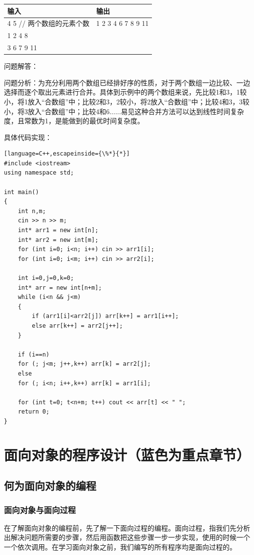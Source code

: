 \documentclass[UTF8]{ctexart}
\begin{document}
\begin{itemize}
\begin{tabular}{|l|l|}
	\hline
	输入 & 输出 \\
	\hline
	4 5 // 两个数组的元素个数 & 1 2 3 4 6 7 8 9 11 \\
	1 2 4 8 & \\
	3 6 7 9 11 & \\
	\hline
\end{tabular}

问题解答：

问题分析：为充分利用两个数组已经排好序的性质，对于两个数组一边比较、一边选择而逐个取出元素进行合并。具体到示例中的两个数组来说，先比较1和3，1较小，将1放入“合数组”中；比较2和3，2较小，将2放入“合数组”中；比较4和3，3较小，将3放入“合数组”中；比较4和6......易见这种合并方法可以达到线性时间复杂度，且常数为1，是能做到的最优时间复杂度。

具体代码实现：
\begin{lstlisting}[language=C++,escapeinside={\%*}{*}]
#include <iostream>
using namespace std;

int main()
{
	int n,m;
	cin >> n >> m;
	int* arr1 = new int[n];
	int* arr2 = new int[m];
	for (int i=0; i<n; i++) cin >> arr1[i];
	for (int i=0; i<m; i++) cin >> arr2[i];
	
	int i=0,j=0,k=0;
	int* arr = new int[n+m];
	while (i<n && j<m)
	{
		if (arr1[i]<arr2[j]) arr[k++] = arr1[i++];
		else arr[k++] = arr2[j++];
	}
	
	if (i==n)
	for (; j<m; j++,k++) arr[k] = arr2[j];
	else
	for (; i<n; i++,k++) arr[k] = arr1[i];
	
	for (int t=0; t<n+m; t++) cout << arr[t] << " ";
	return 0;
}

\end{lstlisting}
\end{itemize}

\section{面向对象的程序设计（蓝色为重点章节）}
\subsection{何为面向对象的编程}
\subsubsection{面向对象与面向过程}
在了解面向对象的编程前，先了解一下面向过程的编程。面向过程，指我们先分析出解决问题所需要的步骤，然后用函数把这些步骤一步一步实现，使用的时候一个一个依次调用。在学习面向对象之前，我们编写的所有程序均是面向过程的。
\end{document}
